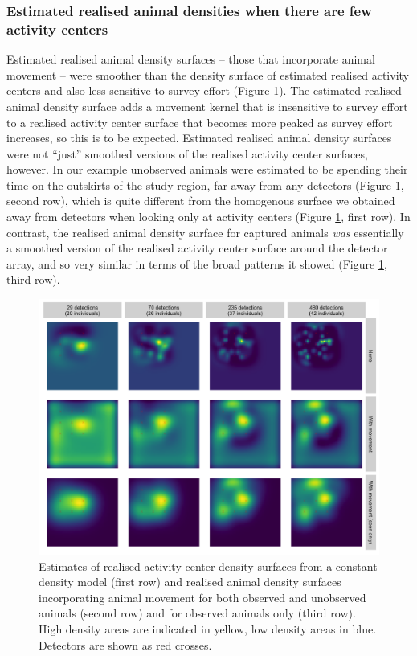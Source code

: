 \documentclass[10pt,a4paper]{article}
\begin{document}
\subsubsection{Estimated realised animal densities when there are few activity centers}

Estimated realised animal density surfaces -- those that incorporate animal movement -- were smoother than the density surface of estimated realised activity centers and also less sensitive to survey effort (Figure \ref{move}). The estimated realised animal density surface adds a movement kernel that is insensitive to survey effort to a realised activity center surface that becomes more peaked as survey effort increases, so this is to be expected. Estimated realised animal density surfaces were not ``just'' smoothed versions of the realised activity center surfaces, however. In our example unobserved animals were estimated to be spending their time on the outskirts of the study region, far away from any detectors (Figure \ref{move}, second row), which is quite different from the homogenous surface we obtained away from detectors when looking only at activity centers (Figure \ref{move}, first row). In contrast, the realised animal density surface for captured animals {\it was} essentially a smoothed version of the realised activity center surface around the detector array, and so very similar in terms of the broad patterns it showed (Figure \ref{move}, third row).

\begin{figure}[htbp]
\centering
\includegraphics[width=1\textwidth]{mona_with_movement.png}
\caption{Estimates of realised activity center density surfaces from a constant density model (first row) and realised animal density surfaces incorporating animal movement for both observed and unobserved animals (second row) and for observed animals only (third row). High density areas are indicated in yellow, low density areas in blue. Detectors are shown as red crosses.}
\label{move}
\end{figure}
\end{document}

